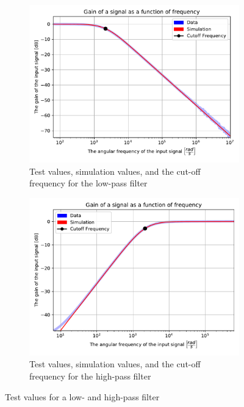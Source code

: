 \begin{figure}[htbp]
\centering
	\begin{subfigure}[b]{0.49\textwidth}
		\includegraphics[width=\textwidth]{fig/img/LPF_exp.pdf}
    		\caption{Test values, simulation values, and the cut-off frequency for the low-pass filter}
    		\label{fig:lpf:exp}
	\end{subfigure}
	\begin{subfigure}[b]{0.49\textwidth}
		\includegraphics[width=\textwidth]{fig/img/HPF_exp.pdf}
    		\caption{Test values, simulation values, and the cut-off frequency for the high-pass filter}
    		\label{fig:hpf:exp}
	\end{subfigure}
	\caption{Test values for a low- and high-pass filter}
\end{figure}
